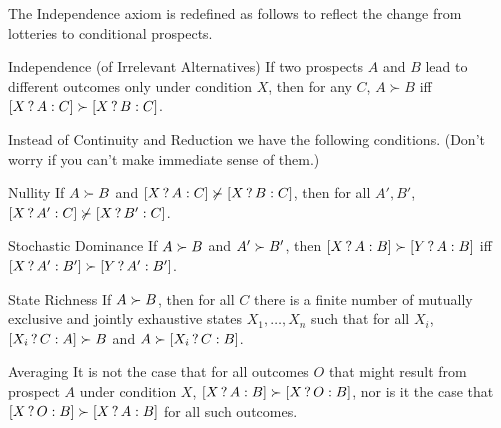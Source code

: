 The Independence axiom is redefined as follows to reflect the change
from lotteries to conditional prospects.
%
%
\begin{genericthm}{Independence (of Irrelevant Alternatives)} 
  If two prospects $A$ and $B$ lead to different outcomes only under
  condition $X$, then for any $C$, $A \succ B$ iff $[X\,?\, A :C]
  \succ [X\,?\, B :C]$.

\end{genericthm}

Instead of Continuity and Reduction we have the following
conditions. (Don't worry if you can't make immediate sense of them.)
%
\begin{genericthm}{Nullity} 
  If $A \succ B$ and $[X\,?\, A :C] \not\succ [X\,?\, B :C]$, then
  for all $A',B'$, $[X\,?\, A' :C] \not\succ [X\,?\, B' :C]$.
\end{genericthm}
%
\vspace{-2mm}
\begin{genericthm}{Stochastic Dominance} 
  If $A \succ B$ and $A'\succ B'$, then $[X\,?\, A :B] \succ
  [Y\,?\, A :B]$ iff $[X\,?\, A' :B'] \succ [Y\,?\, A' :B']$.
\end{genericthm}
%
\vspace{-2mm}
\newpage
\begin{genericthm}{State Richness} 
  If $A \succ B$, then for all $C$ there is a finite number of
  mutually exclusive and jointly exhaustive states $X_1,\ldots,X_n$
  such that for all $X_i$, $[X_i\,?\, C :A] \succ B$ and $A \succ
  [X_i\,?\, C :B]$.
\end{genericthm}
%
\vspace{-2mm}
\begin{genericthm}{Averaging} 
  It is not the case that for all outcomes $O$ that might result from
  prospect $A$ under condition $X$, $[X\,?\, A :B] \succ
  [X\,?\, O :B]$, nor is it the case that $[X\,?\, O :B] \succ
  [X\,?\, A :B]$ for all such outcomes.
\end{genericthm}

